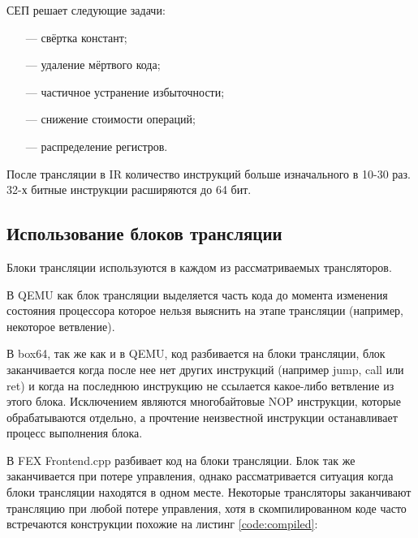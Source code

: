 СЕП решает следующие задачи:
\begin{itemize}[leftmargin=1.6\parindent]
	\item[---] свёртка констант;
	\item[---] удаление мёртвого кода;
	\item[---] частичное устранение избыточности;
	\item[---] снижение стоимости операций;
	\item[---] распределение регистров.
\end{itemize}

После трансляции в IR количество инструкций больше изначального в 10-30 раз. 32-х битные инструкции расширяются до 64 бит.

\subsection{Использование блоков трансляции}

Блоки трансляции используются в каждом из рассматриваемых трансляторов.

В QEMU как блок трансляции выделяется часть кода до момента изменения состояния процессора которое нельзя выяснить на этапе трансляции (например, некоторое ветвление). \cite{qemu_docs}

В box64, так же как и в QEMU, код разбивается на блоки трансляции, блок заканчивается когда после нее нет других инструкций (например jump, call или ret) и когда на последнюю инструкцию не ссылается какое-либо ветвление из этого блока. Исключением являются многобайтовые NOP инструкции, которые обрабатываются отдельно, а прочтение неизвестной инструкции останавливает процесс выполнения блока. \cite{box64_letter}

В FEX Frontend.cpp разбивает код на блоки трансляции. Блок так же заканчивается при потере управления, однако рассматривается ситуация когда блоки трансляции находятся в одном месте. Некоторые трансляторы заканчивают трансляцию при любой потере управления, хотя в скомпилированном коде часто встречаются конструкции похожие на листинг \ref{code:compiled}:


